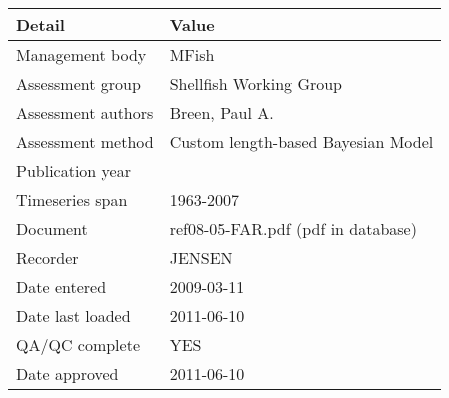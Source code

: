 \begin{table}[htb]
\centering
\begin{tabular}{lp{7cm}}
\toprule
Detail & Value \\
\midrule
Management body    & MFish                              \\
Assessment group   & Shellfish Working Group            \\
Assessment authors & Breen, Paul A.                     \\
Assessment method  & Custom length-based Bayesian Model \\
Publication year   &                                    \\
Timeseries span    & 1963-2007                          \\
Document           & ref08-05-FAR.pdf (pdf in database) \\
Recorder           & JENSEN                             \\
Date entered       & 2009-03-11                         \\
Date last loaded   & 2011-06-10                         \\
QA/QC complete     & YES                                \\
Date approved      & 2011-06-10                         \\
\bottomrule
\end{tabular}
\label{tab:assessdet}
\end{table}
